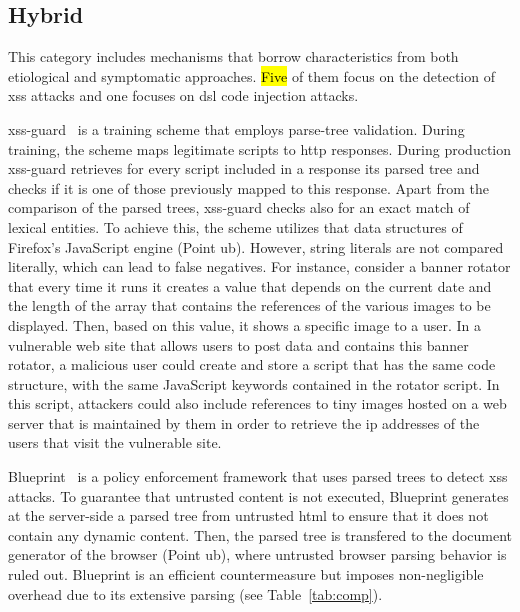 \documentclass[10pt,journal,compsoc]{IEEEtran}
\newcommand{\hlc}[2][yellow]{ {\sethlcolor{#1} \hl{#2}} }
\begin{document}
\subsection{Hybrid}
\label{sec:hybrid}

This category includes mechanisms that borrow
characteristics from both etiological and symptomatic approaches.
\hlc[yellow]{Five} of them focus on the detection of {\sc xss}
attacks and one focuses on {\sc dsl} code injection attacks.

{\sc xss-guard}~\cite{BV08} is a training scheme that employs
parse-tree validation. During training, the scheme maps legitimate
scripts to {\sc http} responses. During production {\sc xss-guard}
retrieves for every script included in a response its parsed tree and
checks if it is one of those previously mapped to this response. Apart
from the comparison of the parsed trees, {\sc xss-guard} checks also
for an exact match of lexical entities. To achieve this, the scheme
utilizes that data structures of Firefox's JavaScript engine (Point
{\sc ub}). However, string literals are not compared literally, which
can lead to false negatives. For instance, consider a banner rotator
that every time it runs it creates a value that depends on the
current date and the length of the array that contains the references
of the various images to be displayed. Then, based on this value, it
shows a specific image to a user. In a vulnerable web site that allows
users to post data and contains this banner rotator, a malicious user
could create and store a script that has the same code structure, with
the same JavaScript keywords contained in the rotator script.
In this script, attackers could also include references to tiny
images hosted on a web server that is maintained by them in order to
retrieve the {\sc ip} addresses of the users that visit the vulnerable
site.

Blueprint~\cite{LV09} is a policy enforcement framework that
uses parsed trees to detect {\sc xss} attacks. To guarantee
that untrusted content is not executed, Blueprint generates at the
server-side a parsed tree from untrusted {\sc html} to ensure that it
does not contain any dynamic content. Then, the parsed tree is
transfered to the document generator of the browser (Point {\sc ub}),
where untrusted browser parsing behavior is ruled out.
Blueprint is an efficient countermeasure but imposes non-negligible
overhead due to its extensive parsing (see Table~\ref{tab:comp}).
\end{document}
